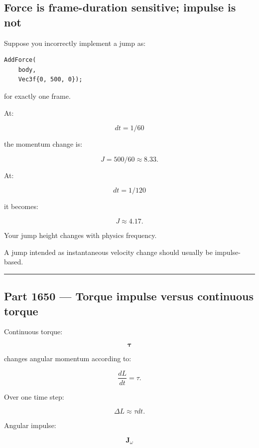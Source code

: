 \subsection{Force is frame-duration sensitive; impulse is not}\label{06-engine-ii-ch036-force-is-frame-duration-sensitive-impulse-is-not}

\hypertarget{06-engine-ii-ch036-force-is-frame-duration-sensitive-impulse-is-not}{}

Suppose you incorrectly implement a jump as:

\begin{verbatim}
AddForce(
    body,
    Vec3f{0, 500, 0});
\end{verbatim}

for exactly one frame.

At:

\[
dt=1/60
\]

the momentum change is:

\[
J=500/60\approx8.33.
\]

At:

\[
dt=1/120
\]

it becomes:

\[
J\approx4.17.
\]

Your jump height changes with physics frequency.

A jump intended as instantaneous velocity change should usually be impulse-based.

\begin{center}\rule{0.5\linewidth}{0.5pt}\end{center}

\subsection{Part 1650 --- Torque impulse versus continuous torque}\label{06-engine-ii-ch036-part-1650-torque-impulse-versus-continuous-torque}

\hypertarget{06-engine-ii-ch036-part-1650-torque-impulse-versus-continuous-torque}{}

Continuous torque:

\[
\boldsymbol\tau
\]

changes angular momentum according to:

\[
\frac{dL}{dt}
=
\tau.
\]

Over one time step:

\[
\Delta L
\approx
\tau dt.
\]

Angular impulse:

\[
\mathbf J_\omega
\]


